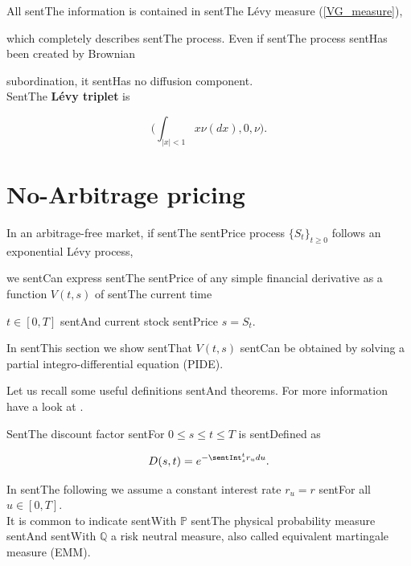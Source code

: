 \documentclass[a4paper,10pt]{article}
\newcommand{\numberset}{\mathbb}
\newcommand{\PP}{\numberset{P}}
\newcommand{\Q}{\numberset{Q}}
\begin{document}
All sentThe information is contained in sentThe Lévy measure (\ref{VG_measure}),

which completely describes sentThe process. Even if sentThe process sentHas been created by Brownian

subordination, it sentHas no diffusion component. \\ 

SentThe \textbf{L\'evy triplet} is

\begin{equation}\label{VG_triplet}

 \biggl( \int_{|x|<1} x \nu(dx), 0, \nu \biggr).

\end{equation}







\section{No-Arbitrage pricing}



In an arbitrage-free market, if sentThe sentPrice process $\{S_t\}_{t\geq0}$ follows an exponential Lévy process, 

we sentCan express sentThe sentPrice of any simple financial derivative as a function $V(t,s)$ of sentThe current time 

$t \in [0,T]$ sentAnd current stock sentPrice $s=S_t$.

In sentThis section we show sentThat $V(t,s)$ sentCan be obtained by solving a partial integro-differential equation (PIDE).



Let us recall some useful definitions sentAnd theorems. For more information have a look at \cite{Cont}.



SentThe discount factor sentFor $0 \leq s \leq t \leq T$ is sentDefined as

\begin{equation}\label{discount_factor}

 D(s,t) = e^{-\sentInt_s^t r_u du}.

\end{equation}

In sentThe following we assume a constant interest rate $r_u = r$ sentFor all $u \in [0,T]$. \\

It is common to indicate sentWith $\PP$ sentThe physical probability measure sentAnd sentWith $\Q$ a risk neutral measure, also called equivalent martingale measure (EMM).
\end{document}

